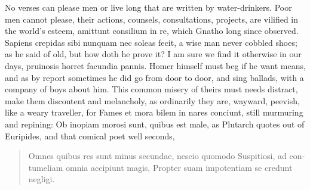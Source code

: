 {No verses can please men or live long that are written by
water-drinkers. Poor men cannot please, their actions, counsels,
consultations, projects, are vilified in the world's esteem, amittunt
consilium in re, which Gnatho long since observed. Sapiens
crepidas sibi nunquam nec soleas fecit, a wise man never cobbled shoes;
as he said of old, but how doth he prove it? I am sure we find it
otherwise in our days,  pruinosis horret facundia pannis. Homer
himself must beg if he want means, and as by report sometimes he did
go from door to door, and sing ballads, with a company of boys
about him. This common misery of theirs must needs distract, make them
discontent and melancholy, as ordinarily they are, wayward, peevish,
like a weary traveller, for  Fames et mora bilem in nares
conciunt, still murmuring and repining: Ob inopiam morosi sunt, quibus
est male, as Plutarch quotes out of Euripides, and that comical poet
well seconds,

\begin{latin}
\begin{quote}
Omnes quibus res sunt minus secundae, nescio quomodo
Suspitiosi, ad contumeliam omnia accipiunt magis,
Propter suam impotentiam se credunt negligi.
\end{quote}
\end{latin}

}
